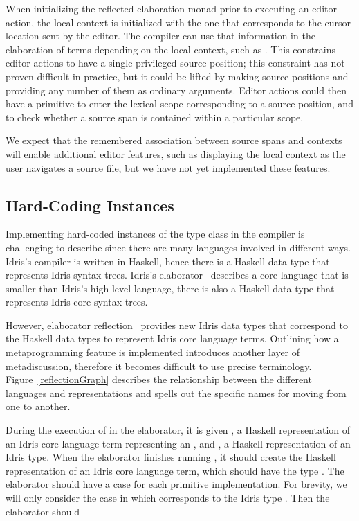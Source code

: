 When initializing the reflected elaboration monad prior to executing
an editor action, the local context is initialized with the one that
corresponds to the cursor location sent by the editor. The compiler
can use that information in the elaboration of terms depending on the
local context, such as . This constrains
editor actions to have a single privileged source position; this
constraint has not proven difficult in practice, but it could be
lifted by making source positions  and providing any
number of them as ordinary arguments. Editor actions could then have a
primitive to enter the lexical scope corresponding to a source
position, and to check whether a source span is contained within a
particular scope.

We expect that the remembered association between source spans and
contexts will enable additional editor features, such as displaying
the local context as the user navigates a source file, but we have not
yet implemented these features.

\subsection{Hard-Coding \Editorable{} Instances}
\label{ssec:hardcodingEditorable}

Implementing hard-coded instances of the \Editorable{} type class in the
compiler is challenging to describe since there are many languages involved in
different ways. Idris's compiler is written in Haskell, hence there is a
Haskell data type that represents Idris syntax trees. Idris's
elaborator~\citep{idris} describes a core language that is smaller than Idris's
high-level language, there is also a Haskell data type that represents Idris
core syntax trees.

However, elaborator reflection~\citep{davidphd, elabref} provides new Idris
data types that correspond to the Haskell data types to represent Idris core
language terms.
Outlining how a metaprogramming feature is implemented introduces another layer of metadiscussion,
therefore it becomes difficult to use precise terminology.
Figure~\ref{reflectionGraph} describes the relationship between the different
languages and representations and spells out the specific names for moving
from one to another.

During the execution of  in the elaborator, it is given
, a Haskell representation of an Idris core language term representing
an \sexp{}, and , a Haskell representation of an Idris type.
When the elaborator finishes running , it should create
the Haskell representation of an Idris core language term, which should have the
type . The elaborator should have a case for each primitive
\Editorable{} implementation. For brevity, we will only consider the case in
which  corresponds to the Idris type \TT{}. Then the elaborator should

